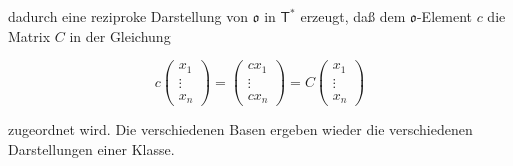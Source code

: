 dadurch eine reziproke Darstellung von \(\mathfrak{o}\) in \(\mathsf T^*\) erzeugt, daß dem \(\mathfrak{o}\)-Element \(c\) die Matrix \(C\) in der Gleichung

\[
c\begin{pmatrix}x_1\\ \vdots\\ x_n\end{pmatrix}
=\begin{pmatrix}cx_1\\ \vdots\\ cx_n\end{pmatrix}
=C\begin{pmatrix}x_1\\ \vdots\\ x_n\end{pmatrix}
\]

zugeordnet wird. Die verschiedenen Basen ergeben wieder die verschiedenen Darstellungen einer Klasse.
